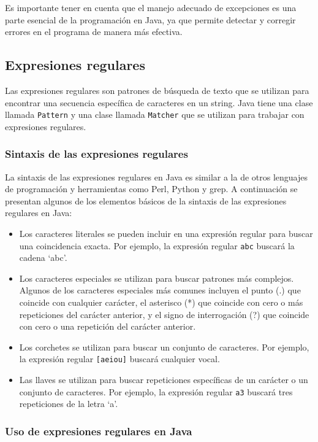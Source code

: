 \documentclass[executivepaper]{article}
\begin{document}
Es importante tener en cuenta que el manejo adecuado de excepciones es una parte esencial de la programación en Java, ya que permite detectar y corregir errores en el programa de manera más efectiva.

\subsection{Expresiones regulares}
Las expresiones regulares son patrones de búsqueda de texto que se utilizan para encontrar una secuencia específica de caracteres en un string. Java tiene una clase llamada \texttt{Pattern} y una clase llamada \texttt{Matcher} que se utilizan para trabajar con expresiones regulares.

\subsubsection{Sintaxis de las expresiones regulares}
La sintaxis de las expresiones regulares en Java es similar a la de otros lenguajes de programación y herramientas como Perl, Python y grep. A continuación se presentan algunos de los elementos básicos de la sintaxis de las expresiones regulares en Java:
\begin{itemize}
    \item Los caracteres literales se pueden incluir en una expresión regular para buscar una coincidencia exacta. Por ejemplo, la expresión regular \texttt{abc} buscará la cadena \enquote*{abc}.
    \item Los caracteres especiales se utilizan para buscar patrones más complejos. Algunos de los caracteres especiales más comunes incluyen el punto (.) que coincide con cualquier carácter, el asterisco (*) que coincide con cero o más repeticiones del carácter anterior, y el signo de interrogación (?) que coincide con cero o una repetición del carácter anterior.
    \item Los corchetes se utilizan para buscar un conjunto de caracteres. Por ejemplo, la expresión regular \texttt{[aeiou]} buscará cualquier vocal.
    \item Las llaves se utilizan para buscar repeticiones específicas de un carácter o un conjunto de caracteres. Por ejemplo, la expresión regular \texttt{a{3}} buscará tres repeticiones de la letra \enquote*{a}.
\end{itemize}

\subsubsection{Uso de expresiones regulares en Java}
\end{document}
